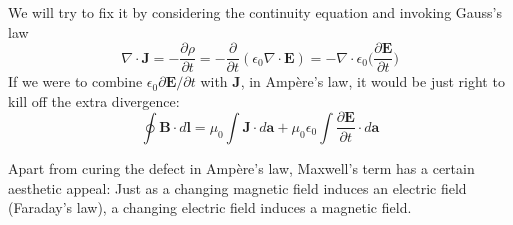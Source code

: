 \documentclass[../../../main.tex]{subfiles}
\begin{document}
We will try to fix it by considering the continuity equation and  invoking Gauss's law
\begin{equation*}
    \nabla\cdot\mathbf{J}=-\frac{\partial \rho}{\partial t}=-\frac{\partial }{\partial t}(\epsilon_0 \nabla\cdot \mathbf{E})=-\nabla\cdot\epsilon_0\biggl(\frac{\partial \mathbf{E}}{\partial t}\biggr)
\end{equation*}
If we were to combine $\epsilon_0 \partial \mathbf{E}/\partial t$ with \textbf{J}, in Ampère’s law, it would be just right to kill off the extra divergence:
\begin{equation*}
    \oint \mathbf{B}\cdot d\mathbf{l} =\mu_0\int\mathbf{J}\cdot d\mathbf{a}+ \mu_0\epsilon_0 \int\frac{\partial \mathbf{E}}{\partial t}\cdot d\mathbf{a}
\end{equation*}

Apart from curing the defect in Ampère’s law, Maxwell’s term has a certain aesthetic appeal: Just as a changing magnetic ﬁeld induces an electric ﬁeld (Faraday’s law), a changing electric ﬁeld induces a magnetic ﬁeld.
\end{document}

